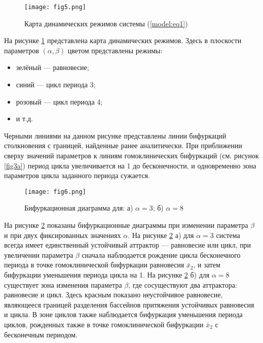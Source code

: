 \documentclass[a4paper, 14pt]{extreport}
\numberwithin{equation}{section}
\numberwithin{figure}{section}
\numberwithin{table}{section}
\begin{document}
			\begin{figure}[h!]
				\begin{center}
					\texttt{[image: fig5.png]}
				\end{center}
				\caption{Карта динамических режимов системы (\ref{model:eq1})}
				\label{fig5}		
			\end{figure}
			На рисунке \ref{fig5} представлена карта динамических режимов. Здесь в плоскости параметров $ (\alpha, \beta) $ цветом представлены режимы:
			\begin{itemize}
				\item зелёный --- равновесие;
				\item синий --- цикл периода 3;
				\item розовый --- цикл периода 4;
				\item и т.д.
			\end{itemize}
			Черными линиями на данном рисунке представлены линии бифуркаций столкновения с границей, найденные ранее аналитически. При приближении сверху значений параметров к линиям гомоклинических бифуркаций (см. рисунок \ref{fig3a}) период цикла увеличивается на 1 до бесконечности, и одновременно зона параметров цикла заданного периода сужается. %

			\begin{figure}[h!]
				\begin{center}
					\texttt{[image: fig6.png]}
				\end{center}
				\caption{Бифуркационная диаграмма для: а) $ \alpha = 3 $; б) $ \alpha = 8 $}
				\label{fig6}		
			\end{figure}
			На рисунке \ref{fig6} показаны бифуркационные диаграммы при изменении параметра $ \beta $ и при двух фиксированных значениях $ \alpha $. На рисунке \ref{fig6} а) для $ \alpha = 3 $ система всегда имеет единственный устойчивый аттрактор --- равновесие или цикл, при увеличении параметра $ \beta $ сначала наблюдается рождение цикла бесконечного периода в точке гомоклинической бифуркации равновесия $ \bar{x}_{2} $, и затем бифуркации уменьшения периода цикла на 1. На рисунке \ref{fig6} б) для $ \alpha = 8 $ существует зона изменения параметра $ \beta $, где сосуществуют два аттрактора: равновесие и цикл. Здесь красным показано неустойчивое равновесие, являющееся границей разделения бассейнов притяжения устойчивых равновесия и цикла. В зоне циклов также наблюдается бифуркация уменьшения периода циклов, рожденных также в точке гомоклинической бифуркации $ \bar{x}_{2} $ с бесконечным периодом. %
\end{document}
